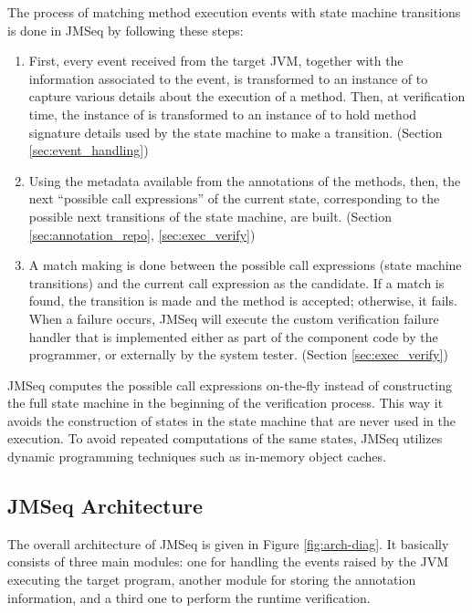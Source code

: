 The process of matching method execution events with state machine transitions is done in JMSeq by following these steps:
\begin{enumerate}
  \item %
  First, every event received from the target JVM, together with the information associated to the event, is transformed to an instance of  to capture various details about the execution of a method. 
  Then, at verification time, the instance of  is transformed to an instance of  to hold method signature details used by the state machine to make a transition. (Section \ref{sec:event_handling})
  \item Using the metadata available from the annotations of the methods, then, the   next ``possible call expressions'' of the current state, corresponding to the possible next transitions of the state machine,  are built. (Section \ref{sec:annotation_repo}, \ref{sec:exec_verify})
  \item A match making is done between the possible call expressions (state machine transitions) and the   current call expression as the candidate.  
  If a match is found,  the transition is made and the method is  accepted; otherwise, it fails. 
  When a failure occurs, JMSeq will execute the custom verification failure handler that is implemented either as part of
  the component code by the programmer, or externally by the system tester. (Section \ref{sec:exec_verify})
\end{enumerate}

JMSeq computes the possible call expressions on-the-fly instead of constructing the full state machine in the beginning of the verification process. 
This way it avoids the construction of states in the state machine that are never used in the execution. 
To avoid repeated computations of the same states, JMSeq utilizes dynamic programming techniques such as in-memory object caches. 

\subsection{JMSeq Architecture}

The overall architecture of JMSeq is given in Figure \ref{fig:arch-diag}. It basically
consists of three main modules: one for handling the events raised by the JVM executing the target program, another module for storing the annotation information, and a third
one to perform the runtime verification.

